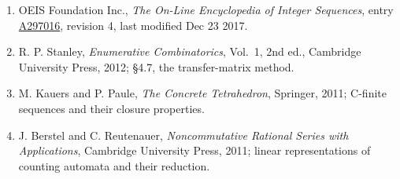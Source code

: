\documentclass[11pt]{article}
\theoremstyle{definition}
\begin{document}
\begin{enumerate}

\item OEIS Foundation Inc., \emph{The On-Line Encyclopedia of Integer Sequences}, entry \href{https://oeis.org/A297016}{A297016}, revision 4, last modified Dec 23 2017.

\item R. P. Stanley, \emph{Enumerative Combinatorics}, Vol.~1, 2nd ed., Cambridge University Press, 2012; \S4.7, the transfer-matrix method.

\item M. Kauers and P. Paule, \emph{The Concrete Tetrahedron}, Springer, 2011; C-finite sequences and their closure properties.

\item J. Berstel and C. Reutenauer, \emph{Noncommutative Rational Series with Applications}, Cambridge University Press, 2011; linear representations of counting automata and their reduction.

\end{enumerate}
\end{document}
